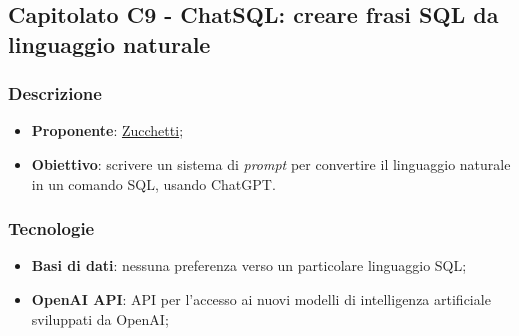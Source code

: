 \subsection{Capitolato C9 - ChatSQL: creare frasi SQL da linguaggio naturale}


\subsubsection{Descrizione}
\begin{itemize}
    \item \textbf{Proponente}: \href{https://www.zucchetti.it/website/cms/home.html}{Zucchetti};
    \item \textbf{Obiettivo}: scrivere un sistema di \textit{prompt} per convertire il linguaggio naturale in un comando SQL, usando ChatGPT.
\end{itemize}


\subsubsection{Tecnologie}
\begin{itemize}
    \item \textbf{Basi di dati}: nessuna preferenza verso un particolare linguaggio SQL;
    \item \textbf{OpenAI API}: API per l'accesso ai nuovi modelli di intelligenza artificiale sviluppati da OpenAI;
\end{itemize}


